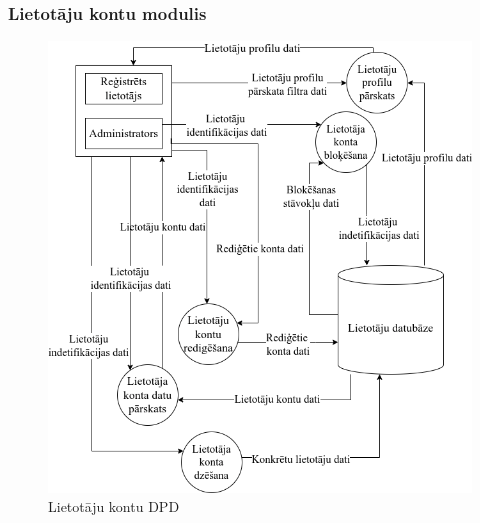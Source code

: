 \subsubsection{Lietotāju kontu modulis}

\begin{figure}[htbp]
	\centering
	\includegraphics[width=\linewidth]{./src/img/LietotājuKontuModulis.png}
	\caption{Lietotāju kontu DPD}
	\label{fig:dpd-2-user}
\end{figure}






